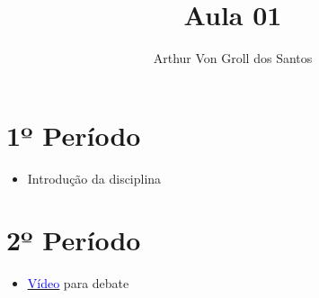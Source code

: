 \documentclass{article}
\author{Arthur Von Groll dos Santos}
\title{Aula 01}
\begin{document}
\maketitle

\section*{\centering 1º Período}
\begin{itemize}
    \item Introdução da disciplina
\end{itemize}

\section*{\centering 2º Período}

\begin{itemize}
    \item \href{https://www.youtube.com/watch?v=sXwQPiSgous}{\underline{\textcolor{blue}{Vídeo}}}  para debate
\end{itemize}
\end{document}
